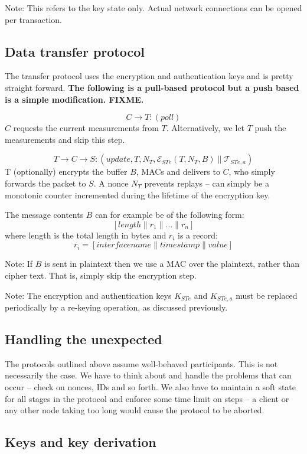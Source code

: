 Note: This refers to the key state only. Actual network connections can be opened per transaction.

\subsection{Data transfer protocol}

The transfer protocol uses the encryption and authentication keys and is pretty straight forward. \textbf{The following is a pull-based protocol but a push based is a simple modification. FIXME.}

\[
C \rightarrow T: (\textit{poll})
\]
$C$ requests the current measurements from $T$. Alternatively, we let $T$ push the measurements and skip this step.

\[
T \rightarrow C \rightarrow S: (\textit{update},T,N_T,\mathcal{E}_{STe}(T,N_T,B) \parallel \mathcal{T}_{STe,a})
\]
T (optionally) encrypts the buffer $B$, MACs and delivers to $C$, who simply forwards the packet to $S$. A nonce $N_T$ prevents replays -- can simply be a monotonic counter incremented during the lifetime of the encryption key.

The message contents $B$ can for example be of the following form:
\[
[length \parallel r_1 \parallel \dots \parallel r_n ]
\]
where length is the total length in bytes and $r_i$ is a record:
\[
r_i = [interface name \parallel timestamp \parallel value ]
\]

Note: If $B$ is sent in plaintext then we use a MAC over the plaintext, rather than cipher text. That is, simply skip the encryption step.

Note: The encryption and authentication keys $K_{STe}$ and $K_{STe,a}$ must be replaced periodically by a re-keying operation, as discussed previously.

\subsection{Handling the unexpected}

The protocols outlined above assume well-behaved participants. This is not necessarily the case. We have to think about and handle the problems that can occur -- check on nonces, IDs and so forth. We also have to maintain a soft state for all stages in the protocol and enforce some time limit on steps -- a client or any other node taking too long would cause the protocol to be aborted.

\subsection{Keys and key derivation}

